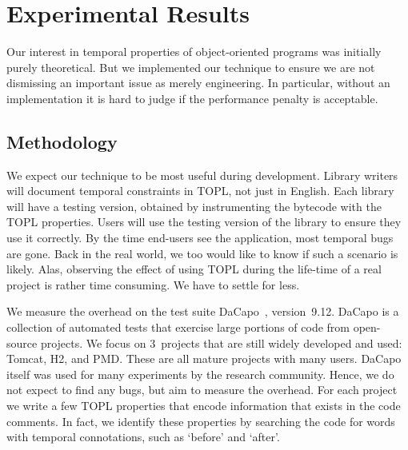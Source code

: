 \documentclass[9pt, preprint]{sigplanconf} %
\newcommand{\noterg}[2]{\textcolor{gray}{[\textcolor{red}{#1}: #2]}}
\newcommand{\dd}[1]{\noterg{dd}{#1}}
\newcommand{\dinocomment}[1]{\dd{#1}}
\theoremstyle{definition}
\theoremstyle{remark}
\begin{document}


\section{Experimental Results}\label{sec:results} %

Our interest in temporal properties of object-oriented programs was initially purely theoretical.
But we implemented our technique to ensure we are not dismissing an important issue as merely engineering.
In particular, without an implementation it is hard to judge if the performance penalty is acceptable.

\subsection{Methodology} %

We expect our technique to be most useful during development.
Library writers will document temporal constraints in TOPL, not just in English.
Each library will have a testing version, obtained by instrumenting the bytecode with the TOPL properties.
Users will use the testing version of the library to ensure they use it correctly.
By the time end-users see the application, most temporal bugs are gone.
Back in the real world, we too would like to know if such a scenario is likely.
Alas, observing the effect of using TOPL during the life-time of a real project is rather time consuming.
We have to settle for less.

We measure the overhead on the test suite DaCapo~\cite{dblp:conf/oopsla/dacapo}, version~9.12.
DaCapo is a collection of automated tests that exercise large portions of code from open-source projects.
We focus on $3$~projects that are still widely developed and used: Tomcat, H2, and PMD\null.
These are all mature projects with many users.
DaCapo itself was used for many experiments by the research community.
Hence, we do not expect to find any bugs, but aim to measure the overhead.
For each project we write a few TOPL properties that encode information that exists in the code comments.
In fact, we identify these properties by searching the code for words with temporal connotations, such as `before' and `after'.
\end{document}
